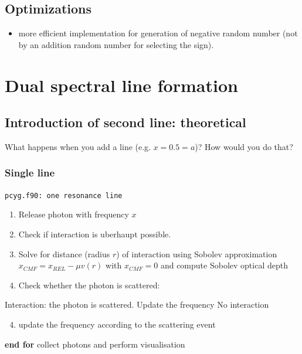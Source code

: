 \documentclass[../main/main.tex]{subfiles}
\begin{document}
\newpage
\subsection{Optimizations}
\begin{itemize}
\item more efficient implementation for generation of negative random number (not by an addition random number for selecting the sign).
\end{itemize}

\newpage
\section{Dual spectral line formation}
\label{two_resonance_lines}

\subsection{Introduction of second line: theoretical}
\label{second_line}
What happens when you add a line (e.g. \@ $x=0.5=a$)? How would you do that?

\subsubsection{Single line}
\begin{center}
\vspace{-0.45cm}
\begin{algorithm}[!htp]
\caption{\texttt{pcyg.f90: one resonance line}}
\label{pcyg_one_line}
\begin{algorithmic}

\begin{enumerate}
\item Release photon with frequency $x$
\item Check if interaction is uberhaupt possible.
\item Solve for distance (radius $r$) of interaction using Sobolev approximation $x_{CMF} = x_{REL} - \mu v(r)$ with $\boxed{x_{CMF} = 0}$ and compute Sobolev optical depth
\item Check whether the photon is scattered:
\end{enumerate}
\State Interaction: the photon is scattered. Update the frequency
\Else \State No interaction
\EndIf

\begin{enumerate}
\setcounter{enumi}{3}
\item update the frequency according to the scattering event
\end{enumerate}
	
\EndFor
\State \textbf{end for}
\State collect photons and perform visualisation

\end{algorithmic}
\end{algorithm}
\end{center}
\end{document}

